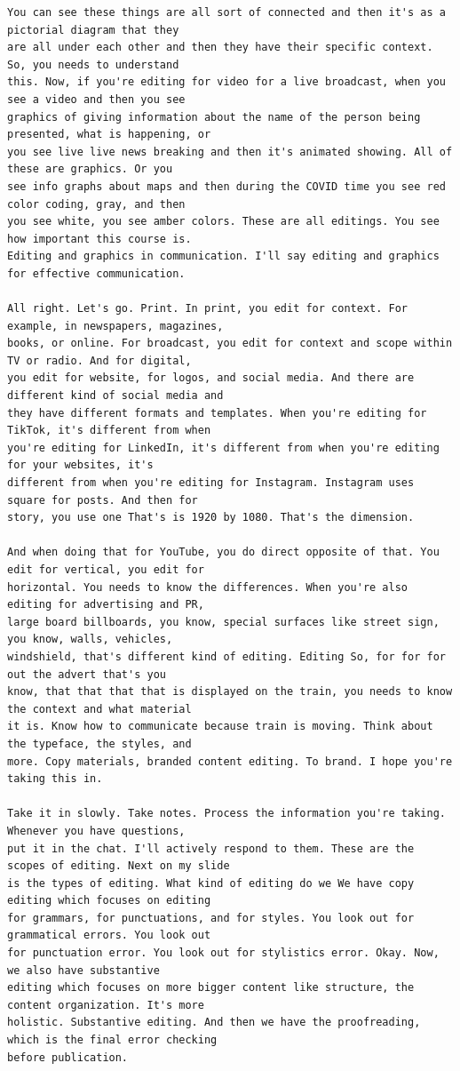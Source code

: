{\begin{Verbatim}
You can see these things are all sort of connected and then it's as a pictorial diagram that they
are all under each other and then they have their specific context. So, you needs to understand
this. Now, if you're editing for video for a live broadcast, when you see a video and then you see
graphics of giving information about the name of the person being presented, what is happening, or
you see live live news breaking and then it's animated showing. All of these are graphics. Or you
see info graphs about maps and then during the COVID time you see red color coding, gray, and then
you see white, you see amber colors. These are all editings. You see how important this course is.
Editing and graphics in communication. I'll say editing and graphics for effective communication.

All right. Let's go. Print. In print, you edit for context. For example, in newspapers, magazines,
books, or online. For broadcast, you edit for context and scope within TV or radio. And for digital,
you edit for website, for logos, and social media. And there are different kind of social media and
they have different formats and templates. When you're editing for TikTok, it's different from when
you're editing for LinkedIn, it's different from when you're editing for your websites, it's
different from when you're editing for Instagram. Instagram uses square for posts. And then for
story, you use one That's is 1920 by 1080. That's the dimension.

And when doing that for YouTube, you do direct opposite of that. You edit for vertical, you edit for
horizontal. You needs to know the differences. When you're also editing for advertising and PR,
large board billboards, you know, special surfaces like street sign, you know, walls, vehicles,
windshield, that's different kind of editing. Editing So, for for for out the advert that's you
know, that that that that is displayed on the train, you needs to know the context and what material
it is. Know how to communicate because train is moving. Think about the typeface, the styles, and
more. Copy materials, branded content editing. To brand. I hope you're taking this in.

Take it in slowly. Take notes. Process the information you're taking. Whenever you have questions,
put it in the chat. I'll actively respond to them. These are the scopes of editing. Next on my slide
is the types of editing. What kind of editing do we We have copy editing which focuses on editing
for grammars, for punctuations, and for styles. You look out for grammatical errors. You look out
for punctuation error. You look out for stylistics error. Okay. Now, we also have substantive
editing which focuses on more bigger content like structure, the content organization. It's more
holistic. Substantive editing. And then we have the proofreading, which is the final error checking
before publication.


\end{Verbatim}}
